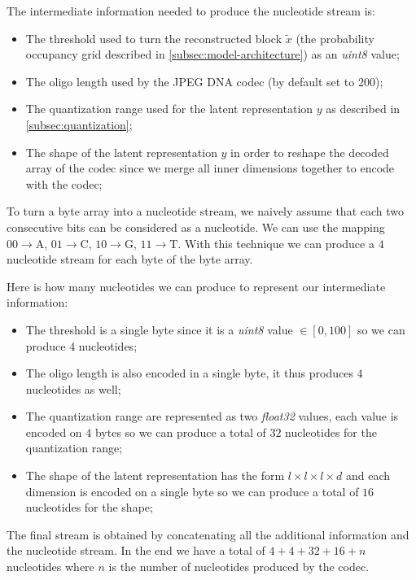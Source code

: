 The intermediate information needed to produce the nucleotide stream is:
\begin{itemize}
    \item The threshold used to turn the reconstructed block $\tilde{x}$ (the probability occupancy grid described in \ref{subsec:model-architecture}) as an \textit{uint8} value;
    \item The oligo length used by the JPEG DNA codec (by default set to 200);
    \item The quantization range used for the latent representation $y$ as described in \ref{subsec:quantization};
    \item The shape of the latent representation $y$ in order to reshape the decoded array of the codec since we merge all inner dimensions together to encode with the codec;
\end{itemize}

To turn a byte array into a nucleotide stream, we naively assume that each two consecutive bits can be considered as a nucleotide. We can use the mapping  
$00 \rightarrow \text{A}$,
$01 \rightarrow \text{C}$,
$10 \rightarrow \text{G}$,
$11 \rightarrow \text{T}$.
With this technique we can produce a $4$ nucleotide stream for each byte of the byte array.

Here is how many nucleotides we can produce to represent our intermediate information:
\begin{itemize}
    \item The threshold is a single byte since it is a \textit{uint8} value $\in [0, 100]$ so we can produce $4$ nucleotides;
    \item The oligo length is also encoded in a single byte, it thus produces $4$ nucleotides as well;
    \item The quantization range are represented as two \textit{float32} values, each value is encoded on $4$ bytes so we can produce a total of $32$ nucleotides for the quantization range;
    \item The shape of the latent representation has the form $l \times l \times l \times d$ and each dimension is encoded on a single byte so we can produce a total of $16$ nucleotides for the shape;
\end{itemize}

The final stream is obtained by concatenating all the additional information and the nucleotide stream. In the end we have a total of $4 + 4 + 32 + 16 + n$ nucleotides where $n$ is the number of nucleotides produced by the codec.

